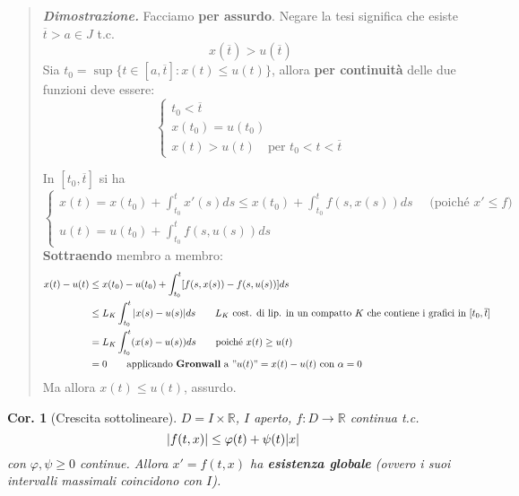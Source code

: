 \documentclass[a4paper,10pt]{article}
\newcommand{\re}{\mathbb{R}} %
\theoremstyle{indentdefinition}
\theoremstyle{indenttheorem}
\newtheorem{cor}{Cor.}
\theoremstyle{myremark}
\theoremstyle{indentgeneral}
\newenvironment{dimo}{\begin{quote}\textit{\textbf{Dimostrazione.}}}{\end{quote}} %
\begin{document}
\begin{dimo}
    Facciamo \textbf{per assurdo}. Negare la tesi significa che  esiste $\overline{t}>a\in J$ t.c.
    $$x(\overline{t})>u(\overline{t})$$
    Sia $t_0=\sup\{t\in[a,\overline{t}]: x(t)\le u(t)\}$, allora \textbf{per continuità} delle due funzioni deve essere:
    $$\begin{cases}
        t_0<\overline{t} \\
        x(t_0)=u(t_0) \\
        x(t)>u(t) \quad \text{per } t_0<t<\overline{t}
    \end{cases}$$

    In $[t_0,\overline{t}]$ si ha
    $$\begin{cases}
        x(t)=x(t_0)+\int_{t_0}^tx'(s)ds\le x(t_0)+\int_{t_0}^tf(s,x(s))ds \quad \text{ (poiché $x'\le f$)} \\
         u(t)=u(t_0)+\int_{t_0}^tf(s,u(s))ds
    \end{cases}$$
    \textbf{Sottraendo} membro a membro:
    \begin{align*}
        x(t)-u(t)&\le x(t_0)-u(t_0)+\int_{t_0}^t[f(s,x(s))-f(s,u(s))]ds \\
        &\le L_K\int_{t_0}^t|x(s)-u(s)|ds  \quad \quad \text{$L_K$ cost. di lip. in un compatto $K$ che contiene i grafici in $[t_0,\overline{t}]$ }\\
        &= L_K\int_{t_0}^t(x(s)-u(s))ds \quad \quad \text{poiché } x(t)\ge u(t) \\
       &=0 \quad \quad \text{applicando \textbf{Gronwall} a $"u(t)"=x(t)-u(t)$ con  $\alpha=0$ }
    \end{align*}
    Ma allora $x(t)\le u(t)$, assurdo.
\end{dimo}

\begin{cor}[Crescita sottolineare]
    $D=I\times\re$, $I$ aperto, $f:D\to\re$ continua t.c. 
    $$\abs{f(t,x)}\le\varphi(t)+\psi(t)\abs{x}$$
    con $\varphi,\psi\ge 0$ continue. Allora $x'=f(t,x)$ ha \textbf{esistenza globale} (ovvero i suoi intervalli massimali coincidono con $I$).
\end{cor}
\end{document}
